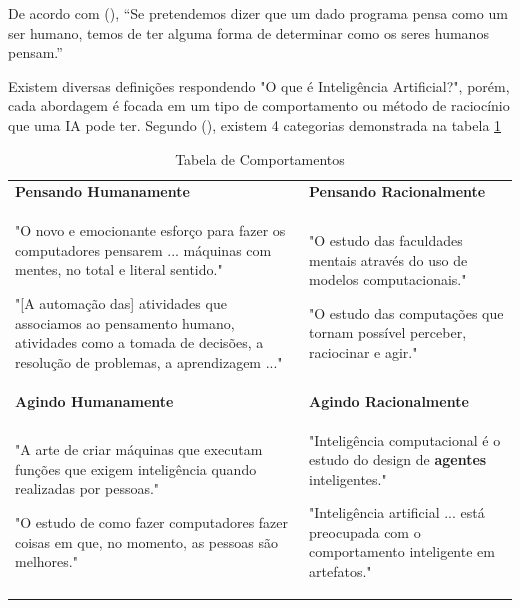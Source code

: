 \documentclass[
	12pt,				%
	openright,			%
	oneside,			%
	a4paper,			%
	english,			%
	spanish,			%
	brazil				%
	]{abntex2}
\begin{document}
	De acordo com \citeauthor{norvig} (\citeyear{norvig}), “Se pretendemos dizer que um dado programa pensa como um ser humano, temos de ter alguma forma de determinar como os seres humanos pensam.”
	
	Existem diversas definições respondendo "O que é Inteligência Artificial?", porém, cada abordagem é focada em um tipo de comportamento ou método de raciocínio que uma IA pode ter. Segundo \citeauthor{norvig} (\citeyear{norvig}), existem 4 categorias demonstrada na tabela \ref{Quatro Categorias}
	

\begin{table}[h]

\centering
{\renewcommand\arraystretch{1.25}
\begin{tabular}{|l|l|l|} \hline \toprule

\multicolumn{1}{p{7.5cm}|}{\textbf{Pensando Humanamente}} 
& 
\multicolumn{2}{p{7.5cm}|}{\textbf{Pensando Racionalmente}} \\

\multicolumn{1}{p{7.5cm}|}{
"O novo e emocionante esforço para fazer os computadores pensarem ... máquinas com mentes, no total e literal sentido." \cite{haugeland}

"[A automação das] atividades que associamos ao pensamento humano, atividades como a tomada de decisões, a resolução de problemas, a aprendizagem ..." \cite{bellman}

} 
& 
\multicolumn{2}{p{7.5cm}|}{

"O estudo das faculdades mentais através do uso de modelos computacionais." \cite{charniak_mcdermott}

"O estudo das computações que tornam possível perceber, raciocinar e agir." \cite{winston}

} \\

\hline


\multicolumn{1}{p{7.5cm}|}{\textbf{Agindo Humanamente}} 
& 
\multicolumn{2}{p{7.5cm}|}{\textbf{Agindo Racionalmente}} \\ 

\multicolumn{1}{p{7.5cm}|}{

"A arte de criar máquinas que executam funções que exigem inteligência quando realizadas por pessoas." \cite{kurzweil}

"O estudo de como fazer computadores fazer coisas em que, no momento, as pessoas são melhores." \cite{rich_knight}

} 
& 
\multicolumn{2}{p{7.5cm}|}{

"Inteligência computacional é o estudo do design de \textbf{agentes} inteligentes." \cite{poole}

"Inteligência artificial ... está preocupada com o comportamento inteligente em artefatos." \cite{nilsson}

} \\ \hline


\end{tabular}}
\caption{Tabela de Comportamentos}
\label{Quatro Categorias}
\end{table}
	
\end{document}
